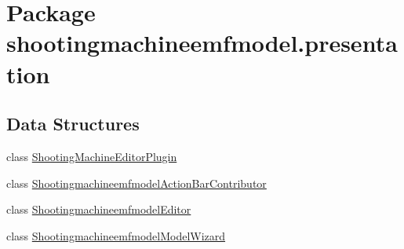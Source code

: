 \hypertarget{namespaceshootingmachineemfmodel_1_1presentation}{\section{Package shootingmachineemfmodel.\-presentation}
\label{namespaceshootingmachineemfmodel_1_1presentation}
}
\subsection*{Data Structures}
\begin{DoxyCompactItemize}
\item 
class \hyperlink{classshootingmachineemfmodel_1_1presentation_1_1_shooting_machine_editor_plugin}{Shooting\-Machine\-Editor\-Plugin}
\item 
class \hyperlink{classshootingmachineemfmodel_1_1presentation_1_1_shootingmachineemfmodel_action_bar_contributor}{Shootingmachineemfmodel\-Action\-Bar\-Contributor}
\item 
class \hyperlink{classshootingmachineemfmodel_1_1presentation_1_1_shootingmachineemfmodel_editor}{Shootingmachineemfmodel\-Editor}
\item 
class \hyperlink{classshootingmachineemfmodel_1_1presentation_1_1_shootingmachineemfmodel_model_wizard}{Shootingmachineemfmodel\-Model\-Wizard}
\end{DoxyCompactItemize}
